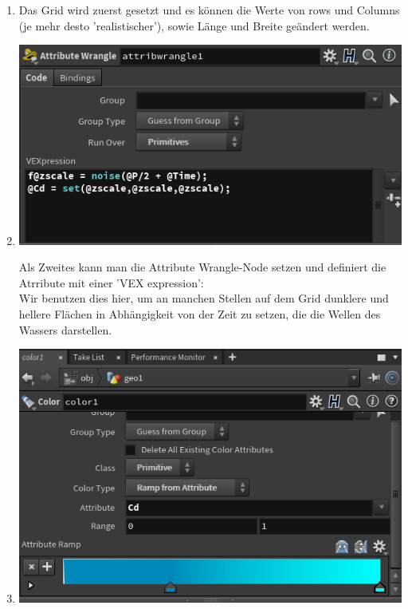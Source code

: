 \documentclass[paper=a4,fontsize=12pt,ngerman]{scrartcl}
\begin{document}
	\begin{enumerate}
		\item Das Grid wird zuerst gesetzt und es können die Werte von rows und Columns (je mehr desto 'realistischer'), sowie Länge und Breite geändert werden. 
		\item 
		\begin{minipage}{0.5\textwidth}
			\includegraphics[width=\textwidth]{graphics/wasser_2.png}
		\end{minipage}
		\begin{minipage}{0.5\textwidth}
			Als Zweites kann man die Attribute Wrangle-Node setzen und definiert die Atrribute mit einer 'VEX expression':\\
			Wir benutzen dies hier, um an manchen Stellen auf dem Grid dunklere und hellere Flächen in Abhängigkeit von der Zeit zu setzen, die die Wellen des Wassers darstellen.
		\end{minipage}
		\item 
		\begin{minipage}{0.5\textwidth}
			\includegraphics[width=\textwidth]{graphics/wasser_3.png}

\end{minipage}
\end{enumerate}
\end{document}

